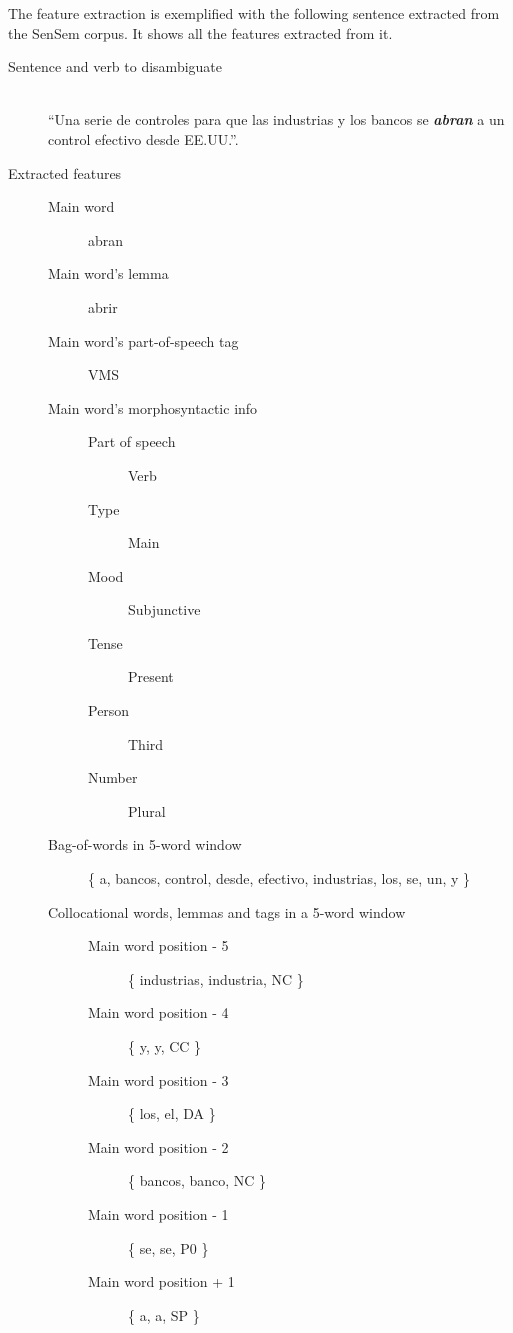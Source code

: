 \begin{example}\label{example:supervised:1}\hfill
  The feature extraction is exemplified with the following sentence extracted
  from the SenSem corpus. It shows all the features extracted from it.

  \begin{description}
    \item[Sentence and verb to disambiguate]\hfill\\
      ``Una serie de controles para que las industrias y los bancos se {\em
      {\bf abran}} a un control efectivo desde EE.UU.''.
    \item[Extracted features]\hfill
      \begin{description}
        \item[Main word] abran
        \item[Main word's lemma] abrir
        \item[Main word's part-of-speech tag] VMS
        \item[Main word's morphosyntactic info]\hfill
          \begin{description}
            \item[Part of speech] Verb
            \item[Type] Main
            \item[Mood] Subjunctive
            \item[Tense] Present
            \item[Person] Third
            \item[Number] Plural
          \end{description}
        \item[Bag-of-words in 5-word window] 
          \{ a, bancos, control, desde, efectivo, industrias, los, se, un, y \}
        \item[Collocational words, lemmas and tags in a 5-word window]\hfill
          \begin{description}
            \item[Main word position - 5] \{ industrias, industria, NC \}
            \item[Main word position - 4] \{ y, y, CC \}
            \item[Main word position - 3] \{ los, el, DA \}
            \item[Main word position - 2] \{ bancos, banco, NC \}
            \item[Main word position - 1] \{ se, se, P0 \}
            \item[Main word position + 1] \{ a, a, SP \}

\end{description}
\end{description}
\end{description}
\end{example}

